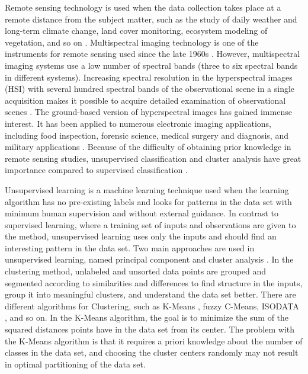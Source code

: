 \documentclass[a4paper, 10pt]{article}
\begin{document}
Remote sensing technology is used when the data collection takes place at a
remote distance from the subject matter, such as the study of daily weather and
long-term climate change, land cover monitoring, ecosystem modeling of
vegetation, and so on \cite{Jensen1996,Mallapragada2018}. Multispectral imaging
technology is one of the instruments for remote sensing used since the late
1960s \cite{Khan2018,Landgrebe1999}. However, multispectral imaging systems use
a low number of spectral bands (three to six spectral bands in different
systems). Increasing spectral resolution in the hyperspectral images (HSI) with
several hundred spectral bands of the observational scene in a single
acquisition makes it possible to acquire detailed examination of observational
scenes \cite{Khan2018}. The ground-based version of hyperspectral images has
gained immense interest. It has been applied to numerous electronic imaging
applications, including food inspection, forensic science, medical surgery and
diagnosis, and military applications
\cite{Govender2009,Adam2009,Fischer2006,Carrasco2003}. Because of the difficulty
of obtaining prior knowledge in remote sensing studies, unsupervised
classification and cluster analysis have great importance compared to supervised
classification \cite{Abbas2016}.

Unsupervised learning is a machine learning technique used when the learning
algorithm has no pre-existing labels and looks for patterns in the data set with
minimum human supervision and without external guidance. In contrast to
supervised learning, where a training set of inputs and observations are given
to the method, unsupervised learning uses only the inputs and should find an
interesting pattern in the data set. Two main approaches are used in
unsupervised learning, named principal component \cite{Mallapragada2018} and
cluster analysis \cite{Xu2015}. In the clustering method, unlabeled and unsorted
data points are grouped and segmented according to similarities and differences
to find structure in the inputs, group it into meaningful clusters, and
understand the data set better. There are different algorithms for Clustering,
such as K-Means \cite{Lloyd1982,Macqueen1967}, fuzzy C-Means, ISODATA
\cite{Ball1965}, and so on. In the K-Means algorithm, the goal is to minimize
the sum of the squared distances points have in the data set from its center.
The problem with the K-Means algorithm is that it requires a priori knowledge
about the number of classes in the data set, and choosing the cluster centers
randomly may not result in optimal partitioning of the data set.
\end{document}
